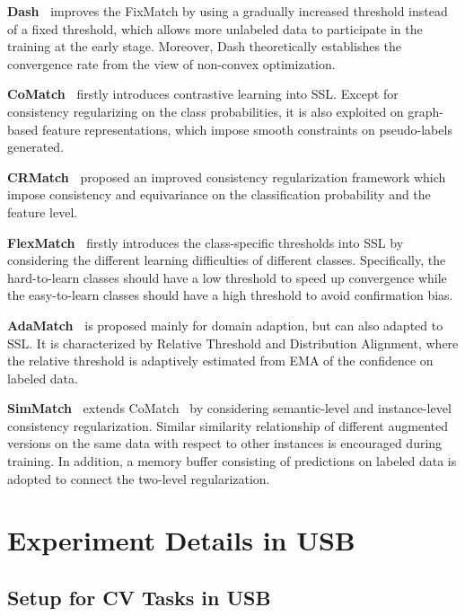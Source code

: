 \documentclass{article}
\begin{document}
\textbf{Dash~\cite{xu2021dash}} improves the FixMatch by using a gradually increased threshold instead of a fixed threshold, which allows more unlabeled data to participate in the training at the early stage. Moreover, Dash theoretically establishes the convergence rate from the view of non-convex optimization. 



\textbf{CoMatch~\cite{li2021comatch}} firstly introduces contrastive learning into SSL. Except for consistency regularizing on the class probabilities, it is also exploited on graph-based feature representations, which impose smooth constraints on pseudo-labels generated.

\textbf{CRMatch~\cite{fan2021revisiting}} proposed an improved consistency regularization framework which impose consistency
and equivariance on the classification probability and the feature level. 

\textbf{FlexMatch~\cite{zhang2021flexmatch}} firstly introduces the class-specific thresholds into SSL by considering the different learning difficulties of different classes. Specifically, the hard-to-learn classes should have a low threshold to speed up convergence while the easy-to-learn classes should have a high threshold to avoid confirmation bias.

\textbf{AdaMatch~\cite{berthelot2021adamatch}} is proposed mainly for domain adaption, but can also adapted to SSL. It is characterized by Relative Threshold and Distribution Alignment, where the relative threshold is adaptively estimated from EMA of the confidence on labeled data. 

\textbf{SimMatch~\cite{zheng2022simmatch}} extends CoMatch~\cite{li2021comatch} by considering semantic-level and instance-level consistency regularization. Similar similarity relationship of different augmented versions on the same data with respect to other instances is encouraged during training. In addition, a memory buffer consisting of predictions on labeled data is adopted to connect the two-level regularization.


\section{Experiment Details in USB}
\label{sec-setup}







\subsection{Setup for CV Tasks in USB}
\end{document}
